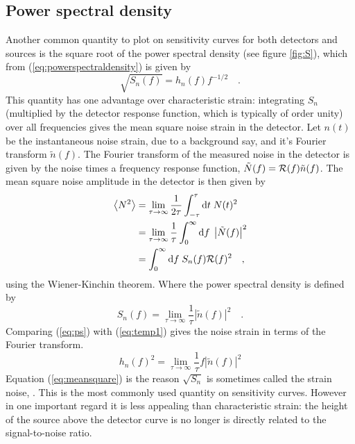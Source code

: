 \subsection{Power spectral density}\label{sec:psd}
Another common quantity to plot on sensitivity curves for both detectors and sources is the square root of the power spectral density (see figure \ref{fig:S}), which from (\ref{eq:powerspectraldensity}) is given by
\begin{equation}\label{eq:temp1} \sqrt{S_{n}(f)}=h_{n}(f)f^{-1/2} \quad .\end{equation}
This quantity has one advantage over characteristic strain: integrating $S_{n}$ (multiplied by the detector response function, which is typically of order unity) over all frequencies gives the mean square noise strain in the detector. Let $n(t)$ be the instantaneous noise strain, due to a background say, and it's Fourier transform $\tilde{n}(f)$. The Fourier transform of the measured noise in the detector is given by the noise times a frequency response function, $\tilde{N}(f)={\cal{R}}(f)\tilde{n}(f)$. The mean square noise amplitude in the detector is then given by
\begin{eqnarray} \label{eq:meansquare}
\left< N^{2} \right> &= \lim_{\tau \rightarrow \infty} \frac{1}{2\tau} \int_{-\tau}^{\tau}\textrm{d}t\; N(t)^{2} \nonumber \\
&=\lim_{\tau\rightarrow\infty}\frac{1}{\tau}\int_{0}^{\infty}\textrm{d}f\;\left|\tilde{N}(f)\right|^{2} \nonumber\\
&= \int_{0}^{\infty}\textrm{d}f\; S_{n}(f){\cal{R}}(f)^{2} \quad ,
\end{eqnarray}
using the Wiener-Kinchin theorem. Where the power spectral density is defined by
\begin{equation}\label{eq:ps} S_{n}(f)=\lim_{\tau\rightarrow\infty}\frac{1}{\tau}\left|\tilde{n}(f)\right|^{2} \quad . \end{equation}
Comparing (\ref{eq:ps}) with (\ref{eq:temp1}) gives the noise strain in terms of the Fourier transform.
\begin{equation} h_{n}(f)^{2}=\lim_{\tau\rightarrow\infty}\frac{1}{\tau}f\left| \tilde{n}(f) \right|^{2} \end{equation}
Equation (\ref{eq:meansquare}) is the reason $\sqrt{S_{n}}$ is sometimes called the strain noise, \cite{Phinney}. This is the most commonly used quantity on sensitivity curves. However in one important regard it is less appealing than characteristic strain: the height of the source above the detector curve is no longer is directly related to the signal-to-noise ratio.


